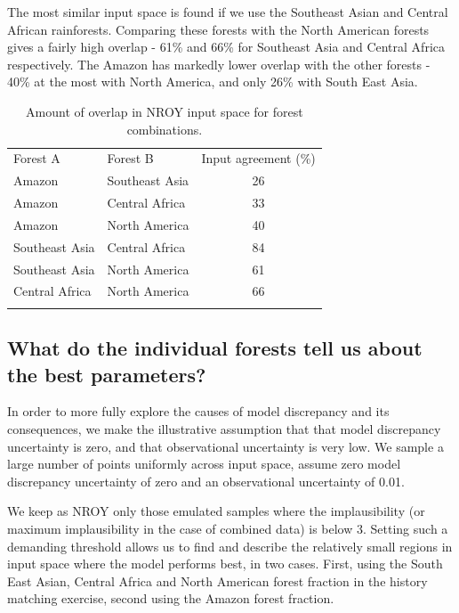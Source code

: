 \documentclass[esd, article]{copernicus} %
\begin{document}
The most similar input space is found if we use the Southeast Asian and Central African rainforests. Comparing these forests with the North American forests gives a fairly high overlap - 61\% and 66\% for Southeast Asia and Central Africa respectively. The Amazon has markedly lower overlap with the other forests - 40\% at the most with North America, and only 26\% with South East Asia.


\begin{table}[t]
\caption{Amount of overlap in NROY input space for forest combinations.}\label{tab:input_overlap}
\begin{tabular}{llc}

\tophline
Forest A &  Forest B & Input agreement (\%) \\
Amazon & Southeast Asia & 26 \\
Amazon & Central Africa & 33 \\
Amazon & North America & 40 \\
Southeast Asia & Central Africa & 84 \\
Southeast Asia & North America & 61 \\
Central Africa  & North America & 66 \\
\bottomhline
\end{tabular}
\belowtable{} %
\end{table}

\subsection{What do the individual forests tell us about the best parameters?}\label{ssec:learn}
In order to more fully explore the causes of model discrepancy and its consequences, we make the illustrative assumption that that model discrepancy uncertainty is zero, and that observational uncertainty is very low. We sample a large number of points uniformly across input space, assume zero model discrepancy uncertainty of zero and an observational uncertainty of 0.01.

We keep as NROY only those emulated samples where the implausibility (or maximum implausibility in the case of combined data) is below 3. Setting such a demanding threshold allows us to find and describe the relatively small regions in input space where the model performs best, in two cases. First, using the South East Asian, Central Africa and North American forest fraction in the history matching exercise, second using the Amazon forest fraction.
\end{document}
